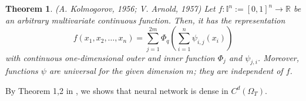 \documentclass{article}
\newtheorem{theorem}{Theorem}[section]
\begin{document}

\begin{theorem}
	 (\textit{A. Kolmogorov, 1956; V. Arnold, 1957}) Let $f : \mathbb{I}^{n} := [0,1]^{n} \rightarrow\mathbb{R}$ be an arbitrary multivariate continuous function. Then, it has the representation
	 \begin{equation}
	 f(x_1,x_2, \dots, x_n)=\sum_{j=1}^{2m}\Phi_{q}\left(\sum_{i=1}^{n}\psi_{i,j}(x_i)\right)
	 \label{eq:komo}
	 \end{equation}
	 with continuous one-dimensional outer and inner function $\Phi_{j}$ and $\psi_{j,i}$. Moreover, functions $\psi$ are universal for the given dimension $m$; they are independent of $f$.
	\end{theorem}
By Theorem 1,2 in \cite{hornik}, we shows that neural network is dense in $C^{d}(\Omega_{T})$.
\end{document}
